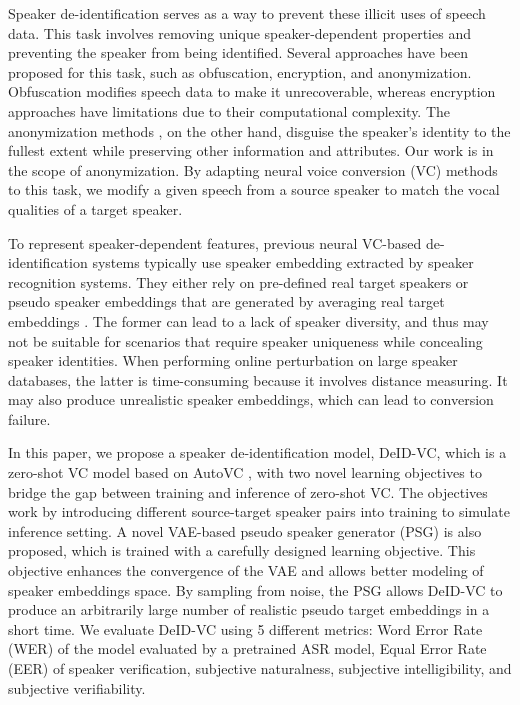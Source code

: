 \documentclass[a4paper]{article}
\begin{document}
Speaker de-identification \cite{tomashenko2020introducing} serves as a way to prevent these illicit uses of speech data. This task involves removing unique speaker-dependent properties and preventing the speaker from being identified. Several approaches have been proposed for this task, such as obfuscation, encryption, and anonymization. Obfuscation \cite{8918913} modifies speech data to make it unrecoverable, whereas encryption approaches \cite{brasser18_interspeech} have limitations due to their computational complexity. The anonymization methods \cite{7472729, qian2017voicemask}, on the other hand, disguise the speaker's identity to the fullest extent while preserving other information and attributes. Our work is in the scope of anonymization. By adapting neural voice conversion (VC) methods to this task, we modify a given speech from a source speaker to match the vocal qualities of a target speaker.

To represent speaker-dependent features, previous neural VC-based de-identification systems typically use speaker embedding extracted by speaker recognition systems. They either rely on pre-defined real target speakers \cite{srivastava2020evaluating} or pseudo speaker embeddings that are generated by averaging real target embeddings \cite{tomashenko2022voiceprivacy, han2020voice, fang2019speaker, srivastava2020design}. The former can lead to a lack of speaker diversity, and thus may not be suitable for scenarios that require speaker uniqueness while concealing speaker identities. When performing online perturbation on large speaker databases, the latter is time-consuming because it involves distance measuring. It may also produce unrealistic speaker embeddings, which can lead to conversion failure.

In this paper, we propose a speaker de-identification model, DeID-VC, which is a zero-shot VC model based on AutoVC \cite{qian2019autovc}, with two novel learning objectives to bridge the gap between training and inference of zero-shot VC. The objectives work by introducing different source-target speaker pairs into training to simulate inference setting.
A novel VAE-based pseudo speaker generator (PSG) is also proposed, which is trained with a carefully designed learning objective. This objective enhances the convergence of the VAE and allows better modeling of speaker embeddings space. By sampling from noise, the PSG allows DeID-VC to produce an arbitrarily large number of realistic pseudo target embeddings in a short time. We evaluate DeID-VC using 5 different metrics: Word Error Rate (WER) of the model evaluated by a pretrained ASR model, Equal Error Rate (EER) of speaker verification, subjective naturalness, subjective intelligibility, and subjective verifiability. 
\end{document}
